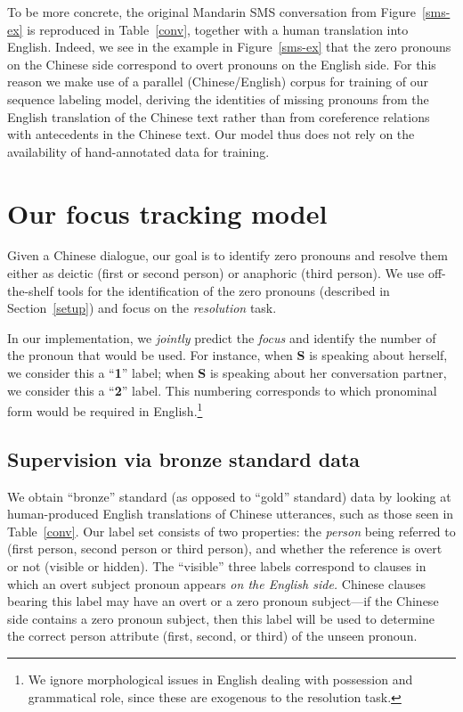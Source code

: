 \documentclass[11pt]{report}
\newcommand{\speaker}[1]{{\bf\footnotesize\textsf{#1}}}
\begin{document}
To be more concrete, the original Mandarin SMS conversation from Figure~\ref{sms-ex} is reproduced in Table~\ref{conv}, together with a human translation into English.
Indeed, we see in the example in Figure~\ref{sms-ex} that the zero pronouns on the Chinese side correspond to overt pronouns on the English side. For this reason we make use of a parallel (Chinese/English) corpus for training of our sequence labeling model, deriving the identities of missing pronouns from the English translation of the Chinese text rather than from coreference relations with antecedents in the Chinese text. Our model thus does not rely on the availability of hand-annotated data for training. 

\section{Our focus tracking model}\label{focus_tracking_model}

Given a Chinese dialogue, our goal is to identify zero pronouns and resolve them either as deictic (first or second person) or anaphoric (third person). We use off-the-shelf tools for the identification of the zero pronouns (described in Section~\ref{setup}) and focus on the \emph{resolution} task.

In our implementation, we \emph{jointly} predict the \emph{focus} and identify the number of the pronoun that would be used. For instance, when \speaker{S} is speaking about herself, we consider this a ``\textbf{1}'' label; when \speaker{S} is speaking about her conversation partner, we consider this a ``\textbf{2}'' label. This numbering corresponds to which pronominal form would be required in English.\footnote{We ignore morphological issues in English dealing with possession and grammatical role, since these are exogenous to the resolution task.}

\subsection{Supervision via bronze standard data} \label{labels}

We obtain ``bronze'' standard (as opposed to ``gold'' standard) data by looking at human-produced English translations of Chinese utterances, such as those seen in Table~\ref{conv}. Our label set consists of two properties: the \emph{person} being referred to (first person, second person or third person), and whether the reference is overt or not (visible or hidden).
The ``visible'' three labels correspond to clauses in which an overt subject pronoun appears \emph{on the English side.} Chinese clauses bearing this label may have an overt or a zero pronoun subject---if the Chinese side contains a zero pronoun subject, then this label will be used to determine the correct person attribute (first, second, or third) of the unseen pronoun.
\end{document}
